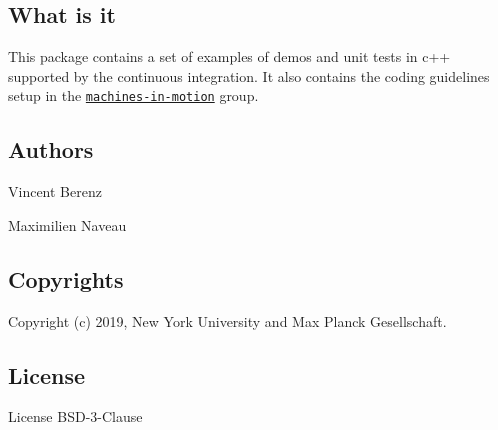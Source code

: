 \subsection*{What is it}

This package contains a set of examples of demos and unit tests in c++ supported by the continuous integration. It also contains the coding guidelines setup in the \href{https://wp.nyu.edu/machinesinmotion/}{\tt machines-\/in-\/motion} group.

\subsection*{Authors}


\begin{DoxyItemize}
\item Vincent Berenz
\item Maximilien Naveau
\end{DoxyItemize}

\subsection*{Copyrights}

Copyright (c) 2019, New York University and Max Planck Gesellschaft.

\subsection*{License}

License B\+S\+D-\/3-\/\+Clause 